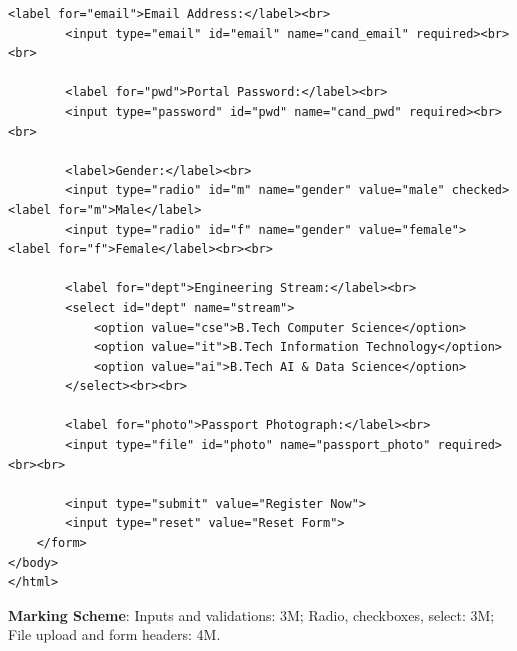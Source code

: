 \begin{solutionbox}
\begin{enumerate}[start=7]
\begin{lstlisting}[language=HTML5]
        <label for="email">Email Address:</label><br>
        <input type="email" id="email" name="cand_email" required><br><br>

        <label for="pwd">Portal Password:</label><br>
        <input type="password" id="pwd" name="cand_pwd" required><br><br>

        <label>Gender:</label><br>
        <input type="radio" id="m" name="gender" value="male" checked> <label for="m">Male</label>
        <input type="radio" id="f" name="gender" value="female"> <label for="f">Female</label><br><br>

        <label for="dept">Engineering Stream:</label><br>
        <select id="dept" name="stream">
            <option value="cse">B.Tech Computer Science</option>
            <option value="it">B.Tech Information Technology</option>
            <option value="ai">B.Tech AI & Data Science</option>
        </select><br><br>

        <label for="photo">Passport Photograph:</label><br>
        <input type="file" id="photo" name="passport_photo" required><br><br>

        <input type="submit" value="Register Now">
        <input type="reset" value="Reset Form">
    </form>
</body>
</html>
\end{lstlisting}
\textbf{Marking Scheme}: Inputs and validations: 3M; Radio, checkboxes, select: 3M; File upload and form headers: 4M.
\end{enumerate}
\end{solutionbox}

